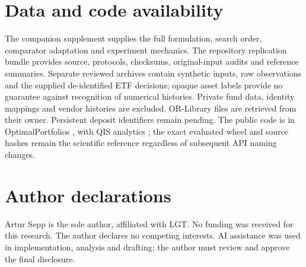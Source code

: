 \documentclass[preprint,12pt,authoryear]{elsarticle}
\begin{document}
\section*{Data and code availability}
The companion supplement supplies the full formulation, search order,
comparator adaptation and experiment mechanics. The repository replication
bundle provides source, protocols, checksums, original-input audits and reference
summaries. Separate reviewed archives contain synthetic inputs, raw observations
and the supplied de-identified ETF decisions; opaque asset labels provide
no guarantee against recognition of numerical histories. Private fund data,
identity mappings and vendor histories are excluded. OR-Library files are
retrieved from their owner. Persistent deposit identifiers remain pending.
The public code is in OptimalPortfolios \citep{op}, with QIS analytics
\citep{qis}; the exact evaluated wheel and source hashes remain the scientific
reference regardless of subsequent API naming changes.

\section*{Author declarations}
Artur Sepp is the sole author, affiliated with LGT. No funding was received for
this research. The author declares no competing interests. AI assistance was used
in implementation, analysis and drafting; the author must review and approve
the final disclosure.
\end{document}
